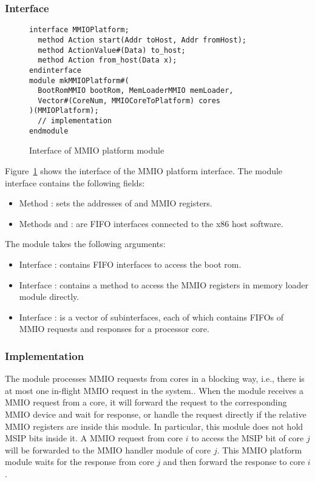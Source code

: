 \subsubsection{Interface}

\begin{figure}
\begin{lstlisting}[caption={}]
interface MMIOPlatform;
  method Action start(Addr toHost, Addr fromHost);
  method ActionValue#(Data) to_host;
  method Action from_host(Data x);
endinterface
module mkMMIOPlatform#(
  BootRomMMIO bootRom, MemLoaderMMIO memLoader,
  Vector#(CoreNum, MMIOCoreToPlatform) cores
)(MMIOPlatform);
  // implementation
endmodule
\end{lstlisting}
\caption{Interface of MMIO platform module}\label{fig:mmio-platform-ifc}
\end{figure}

Figure~\ref{fig:mmio-platform-ifc} shows the interface of the MMIO platform interface.
The module interface  contains the following fields:
\begin{itemize}
    \item Method : sets the addresses of  and  MMIO registers.
    \item Methods  and : are FIFO interfaces connected to the x86 host software.
\end{itemize}
The module takes the following arguments:
\begin{itemize}
    \item Interface : contains FIFO interfaces to access the boot rom.
    \item Interface : contains a method to access the MMIO registers in memory loader module directly.
    \item Interface : is a vector of subinterfaces, each of which contains FIFOs of MMIO requests and responses for a processor core.
\end{itemize}

\subsubsection{Implementation}
The module processes MMIO requests from cores in a blocking way, i.e., there is at most one in-flight MMIO request in the system..
When the module receives a MMIO request from a core, it will forward the request to the corresponding MMIO device and wait for response, or handle the request directly if the relative MMIO registers are inside this module.
In particular, this module does not hold MSIP bits inside it.
A MMIO request from core $i$ to access the MSIP bit of core $j$ will be forwarded to the MMIO handler module of core $j$.
This MMIO platform module waits for the response from core $j$ and then forward the response to core $i$.

